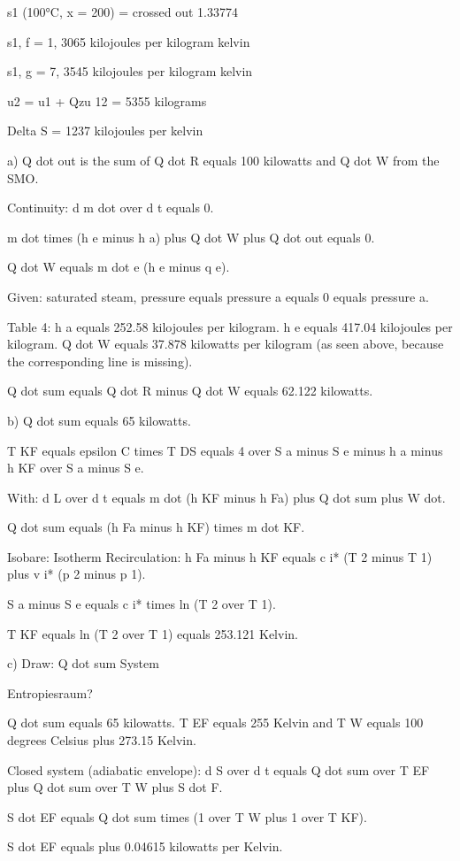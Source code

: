 s1 (100°C, x = 200) = crossed out 1.33774

s1, f = 1, 3065 kilojoules per kilogram kelvin

s1, g = 7, 3545 kilojoules per kilogram kelvin

u2 = u1 + Qzu 12 = 5355 kilograms

Delta S = 1237 kilojoules per kelvin

a) Q dot out is the sum of Q dot R equals 100 kilowatts and Q dot W from the SMO.

Continuity:
d m dot over d t equals 0. 

m dot times (h e minus h a) plus Q dot W plus Q dot out equals 0.

Q dot W equals m dot e (h e minus q e).

Given: saturated steam, pressure equals pressure a equals 0 equals pressure a.

Table 4:
h a equals 252.58 kilojoules per kilogram.
h e equals 417.04 kilojoules per kilogram.
Q dot W equals 37.878 kilowatts per kilogram (as seen above, because the corresponding line is missing).

Q dot sum equals Q dot R minus Q dot W equals 62.122 kilowatts.

b) Q dot sum equals 65 kilowatts.

T KF equals epsilon C times T DS equals 4 over S a minus S e minus h a minus h KF over S a minus S e.

With:
d L over d t equals m dot (h KF minus h Fa) plus Q dot sum plus W dot.

Q dot sum equals (h Fa minus h KF) times m dot KF.

Isobare:
Isotherm Recirculation:
h Fa minus h KF equals c i* (T 2 minus T 1) plus v i* (p 2 minus p 1).

S a minus S e equals c i* times ln (T 2 over T 1).

T KF equals ln (T 2 over T 1) equals 253.121 Kelvin.

c) Draw:
Q dot sum System

Entropiesraum?

Q dot sum equals 65 kilowatts.
T EF equals 255 Kelvin and T W equals 100 degrees Celsius plus 273.15 Kelvin.

Closed system (adiabatic envelope):
d S over d t equals Q dot sum over T EF plus Q dot sum over T W plus S dot F.

S dot EF equals Q dot sum times (1 over T W plus 1 over T KF).

S dot EF equals plus 0.04615 kilowatts per Kelvin.